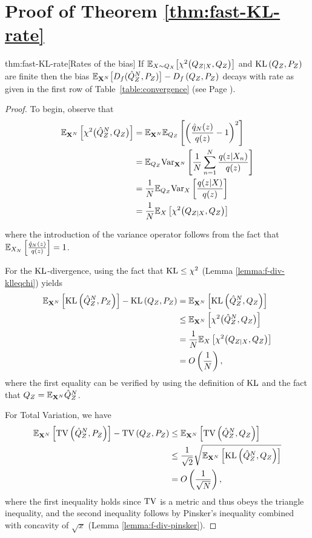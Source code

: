 \section{Proof of Theorem \ref{thm:fast-KL-rate}}\label{appendix:subsec:thm1}




\begin{reptheorem}{thm:fast-KL-rate}[Rates of the bias]
If
$\mathbb{E}_{X\sim Q_X}\bigl[\chi^2\bigl(Q_{Z|X}, Q_Z\bigr)\bigr]$ and
$\mathrm{KL}\left( Q_{Z} , P_Z\right)$ are finite then the bias ${\mathbb{E}_{\mathbf{X}^N}\bigl[D_f( \hat{Q}_Z^N , P_Z)\bigr] - D_f\left( Q_{Z} , P_Z\right)}$ decays with rate as given in the first row of Table~\ref{table:convergence} (see Page \pageref{table:convergence}).
\end{reptheorem}

\begin{proof}
To begin, observe that 
\begin{align*}
    \mathbb{E}_{\mathbf{X}^N}\left[\chi^2\bigl(\hat{Q}^N_Z, Q_Z\bigr)\right]
    &= \mathbb{E}_{\mathbf{X}^N}\mathbb{E}_{Q_Z}\left[\left(\frac{\hat{q}_N(z)}{q(z)} - 1\right)^2 \right]\\
    &=\mathbb{E}_{Q_Z} \text{Var}_{\mathbf{X}^N} \left[ \frac{1}{N} \sum_{n=1}^N\frac{q(z|X_n)}{q(z)}\right] \\
    &= \frac{1}{N} \mathbb{E}_{Q_Z}\text{Var}_X \left[ \frac{q(z|X)}{q(z)} \right]\\
    &= \frac{1}{N}\mathbb{E}_{X}\left[\chi^2\bigl(Q_{Z|X}, Q_Z\bigr) \right]
\end{align*}

where the introduction of the variance operator follows from the fact that $\mathbb{E}_{X_N}\left[ \frac{\hat{q}_N(z)}{q(z)} \right] = 1$.

For the $\mathrm{KL}$-divergence, using the fact that $\mathrm{KL} \leq \chi^2$ (Lemma \ref{lemma:f-div-klleqchi}) yields
\begin{align*}
    \mathbb{E}_{\mathbf{X}^N}\left[\mathrm{KL}\left( \hat{Q}^N_Z , P_Z\right)\right] - \mathrm{KL}\left( Q_{Z} , P_Z\right) &=\mathbb{E}_{\mathbf{X}^N}\left[\mathrm{KL}\left( \hat{Q}^N_Z , Q_Z\right)\right]\\
    &\leq \mathbb{E}_{\mathbf{X}^N}\left[\chi^2\bigl(\hat{Q}^N_Z, Q_Z\bigr) \right]\\
    &= \frac{1}{N}\mathbb{E}_{X}\left[\chi^2\bigl(Q_{Z|X}, Q_Z\bigr)\right]\\
    &=O\left(\frac{1}{N}\right),
\end{align*}
where the first equality can be verified by using the definition of $\mathrm{KL}$ and the fact that $Q_Z = \mathbb{E}_{\mathbf{X}^N}\hat{Q}^N_Z$.

For Total Variation, we have
\begin{align*}
    \mathbb{E}_{\mathbf{X}^N}\left[\mathrm{TV}\left( \hat{Q}^N_Z , P_Z\right)\right] - \mathrm{TV}\left( Q_{Z} , P_Z\right) &\leq\mathbb{E}_{\mathbf{X}^N}\left[\mathrm{TV}\left( \hat{Q}^N_Z , Q_Z\right)\right]\\
    &\leq \frac{1}{\sqrt{2}} \sqrt{\mathbb{E}_{\mathbf{X}^N}\left[\mathrm{KL}\left( \hat{Q}^N_Z , Q_Z\right) \right]}\\
    &=O\left(\frac{1}{\sqrt{N}}\right),
\end{align*}
where the first inequality holds since $\mathrm{TV}$ is a metric and thus obeys the triangle inequality, and the second inequality follows by Pinsker's inequality combined with concavity of $\sqrt{x}$ (Lemma \ref{lemma:f-div-pinsker}).


\end{proof}
